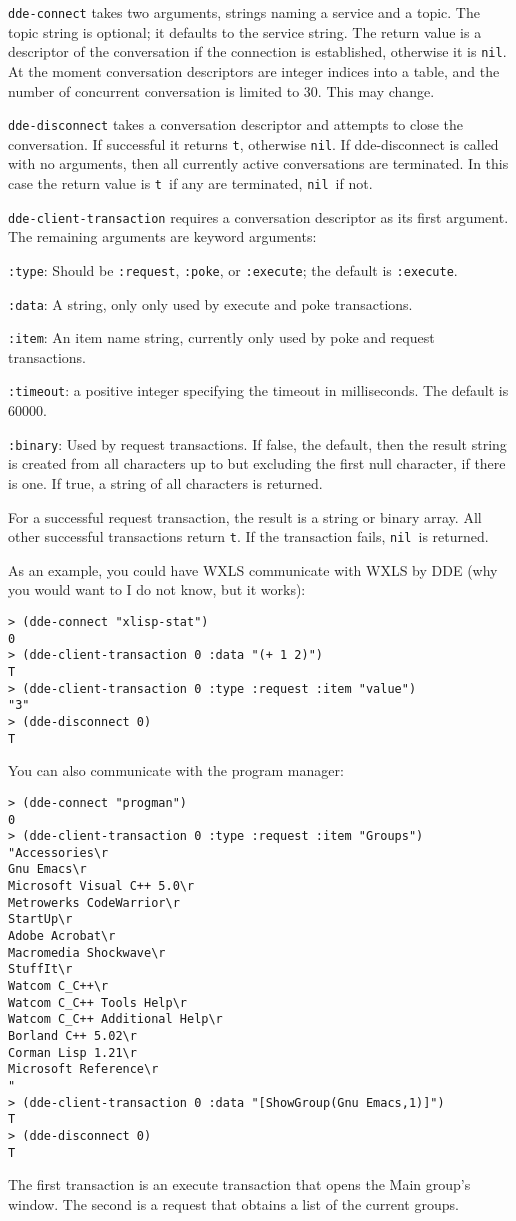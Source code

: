 \documentclass[11pt]{article}
\newcommand{\lfun}[1]{{\tt #1}}
\newcommand{\lkeyword}[1]{{\tt :#1}}
\newcommand{\NIL}{{\tt nil}}
\newcommand{\TRUE}{{\tt t}}
\begin{document}
\lfun{dde-connect} takes two arguments, strings naming a service and
a topic.  The topic string is optional; it defaults to the service
string. The return value is a descriptor of the conversation if the
connection is established, otherwise it is \NIL. At the moment
conversation descriptors are integer indices into a table, and the
number of concurrent conversation is limited to 30. This may change.

\lfun{dde-disconnect} takes a conversation descriptor and attempts to
close the conversation. If successful it returns \TRUE, otherwise
\NIL.  If dde-disconnect is called with no arguments, then all
currently active conversations are terminated. In this case the return
value is \TRUE\ if any are terminated, \NIL\ if not.

\lfun{dde-client-transaction} requires a conversation descriptor as
its first argument. The remaining arguments are keyword arguments:
\begin{description}
\item \lkeyword{type}: Should be \lkeyword{request}, \lkeyword{poke},
  or \lkeyword{execute}; the default is \lkeyword{execute}.
\item \lkeyword{data}: A string, only only used by execute and poke
  transactions.
\item \lkeyword{item}: An item name string, currently only used by
  poke and request transactions.
\item \lkeyword{timeout}: a positive integer specifying the timeout in
  milliseconds. The default is 60000.
\item \lkeyword{binary}: Used by request transactions.  If false, the
  default, then the result string is created from all characters up to
  but excluding the first null character, if there is one.  If true, a
  string of all characters is returned.
\end{description}
For a successful request transaction, the result is a string or binary
array. All other successful transactions return \TRUE. If the
transaction fails, \NIL\ is returned.

As an example, you could have WXLS communicate with WXLS by DDE (why
you would want to I do not know, but it works):
\begin{verbatim}
> (dde-connect "xlisp-stat")
0
> (dde-client-transaction 0 :data "(+ 1 2)")
T
> (dde-client-transaction 0 :type :request :item "value")
"3"
> (dde-disconnect 0)
T
\end{verbatim}
You can also communicate with the program manager:
\begin{verbatim}
> (dde-connect "progman")
0
> (dde-client-transaction 0 :type :request :item "Groups")
"Accessories\r
Gnu Emacs\r
Microsoft Visual C++ 5.0\r
Metrowerks CodeWarrior\r
StartUp\r
Adobe Acrobat\r
Macromedia Shockwave\r
StuffIt\r
Watcom C_C++\r
Watcom C_C++ Tools Help\r
Watcom C_C++ Additional Help\r
Borland C++ 5.02\r
Corman Lisp 1.21\r
Microsoft Reference\r
"
> (dde-client-transaction 0 :data "[ShowGroup(Gnu Emacs,1)]")
T
> (dde-disconnect 0)
T
\end{verbatim}
The first transaction is an execute transaction that opens the Main
group's window. The second is a request that obtains a list of the
current groups.
\end{document}
